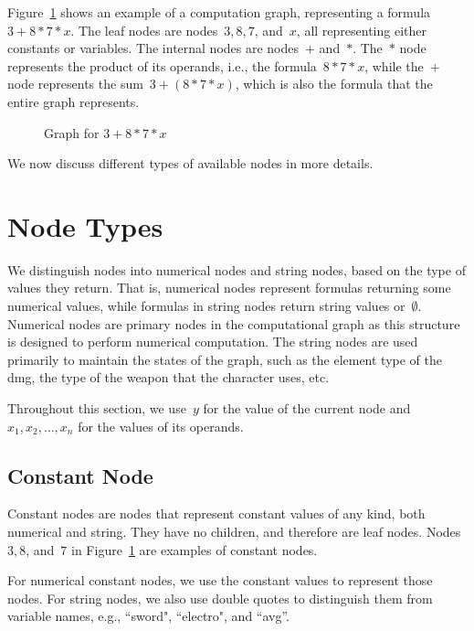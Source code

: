\documentclass{article}
\begin{document}
Figure~\ref{fig:design:graph-example} shows an example of a computation graph, representing a formula~$3 + 8 * 7 * x$.
The leaf nodes are nodes~$3, 8, 7$, and~$x$, all representing either constants or variables.
The internal nodes are nodes~$+$ and~$*$.
The~$*$ node represents the product of its operands, i.e., the formula~$8 * 7 * x$, while the~$+$ node represents the sum~$3 + (8 * 7 * x)$, which is also the formula that the entire graph represents.
%
\begin{figure}
	\centering
	\caption{Graph for $3 + 8 * 7 * x$}
	\label{fig:design:graph-example}
\end{figure}

We now discuss different types of available nodes in more details.

\section{Node Types}

We distinguish nodes into numerical nodes and string nodes, based on the type of values they return.
That is, numerical nodes represent formulas returning some numerical values, while formulas in string nodes return string values or~$\emptyset$.
Numerical nodes are primary nodes in the computational graph as this structure is designed to perform numerical computation.
The string nodes are used primarily to maintain the states of the graph, such as the element type of the dmg, the type of the weapon that the character uses, etc.

Throughout this section, we use~$y$ for the value of the current node and~$x_1, x_2, \dots, x_n$ for the values of its operands.

\subsection{Constant Node}

Constant nodes are nodes that represent constant values of any kind, both numerical and string.
They have no children, and therefore are leaf nodes.
Nodes~$3, 8$, and~$7$ in Figure~\ref{fig:design:graph-example} are examples of constant nodes.

For numerical constant nodes, we use the constant values to represent those nodes.
For string nodes, we also use double quotes to distinguish them from variable names, e.g., ``sword", ``electro", and ``avg''.
\end{document}
